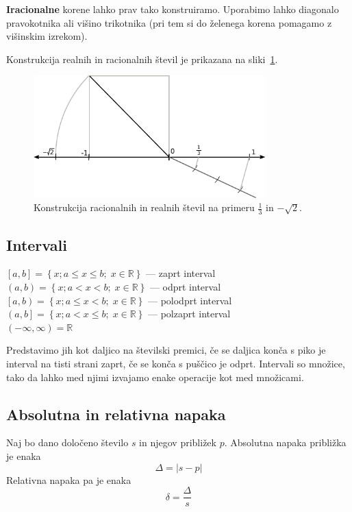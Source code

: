 \documentclass[a4paper,oneside,12pt,fleqn]{article}
\def\R{\ensuremath{\mathbb R}}
\numberwithin{equation}{section}
\begin{document}
\textbf{Iracionalne} korene lahko prav tako konstruiramo. Uporabimo lahko diagonalo pravokotnika ali višino
trikotnika (pri tem si do želenega korena pomagamo z višinskim izrekom).

Konstrukcija realnih in racionalnih števil je prikazana na sliki~\ref{fig:real:konstr}.

\begin{figure}[ht]
  \begin{center}
    \includegraphics[width=0.8\textwidth]{slike/realrac.pdf}
  \end{center}
  \caption{Konstrukcija racionalnih in realnih števil na primeru $\frac{1}{3}$ in $-\sqrt{2}$.}
  \label{fig:real:konstr}
\end{figure}

\subsection{Intervali}
\label{sec:realna:intervali}
$\left[a,b \right] = \left\{x; a \leq x \leq b; \; x \in \R \right\}$ --- zaprt interval \\
$\left(a,b \right) = \left\{x; a < x < b; \; x \in \R \right\}$ --- odprt interval \\
$\left[a,b \right) = \left\{x; a \leq x < b; \; x \in \R \right\}$ --- polodprt interval \\
$\left(a,b \right] = \left\{x; a < x \leq b; \; x \in \R \right\}$ --- polzaprt interval \\
$(-\infty,\infty) = \R$

Predstavimo jih kot daljico na številski premici, če se daljica konča s piko je interval na tisti
strani zaprt, če se konča s puščico je odprt. Intervali so množice, tako da lahko med njimi izvajamo
enake operacije kot med množicami.

\subsection{Absolutna in relativna napaka}
\label{sec:realna:nap}
Naj bo dano določeno število $s$ in njegov približek $p$.
Absolutna napaka približka je enaka 
\[ \Delta = |s-p| \]
Relativna napaka pa je enaka
\[ \delta = \frac{\Delta}{s} \]
\end{document}

